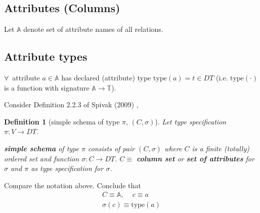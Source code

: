 \documentclass[10pt]{amsart}
\newtheorem{definition}{Definition}
\begin{document}
\begin{multicols*}{2}
\subsection{Attributes (Columns)}

Let $\mathbb{A}$ denote set of attribute names of all relations.

\subsection{Attribute types}
$\forall \, $ attribute $a\in \mathbb{A}$ has declared (attribute) type $\text{type}(a) = t\in DT$ (i.e. $\text{type}(\cdot)$ is a function with signature $\mathbb{A} \to \mathbb{T}$).

Consider Definition 2.2.3 of Spivak (2009) \cite{Spiv2009}, 

\begin{definition}[simple schema of type $\pi$, $(C,\sigma)$]
	Let type specification $\pi :V \to DT$. 
	
	\textbf{simple schema} of type $\pi$ consists of pair $(C, \sigma)$ where $C$ is a finite (totally) ordered set and function $\sigma : C \to DT$.  $C \equiv $ \textbf{column set} or \textbf{set of attributes} for $\sigma$ and $\pi$ as \emph{type specification for} $\sigma$.
\end{definition}

Compare the notation above. Conclude that
\[
\begin{gathered}
C \equiv \mathbb{A}, \quad \, c \equiv a \\
\sigma(c) \equiv \text{type}(a)
\end{gathered}
\]


\end{multicols*}
\end{document}
